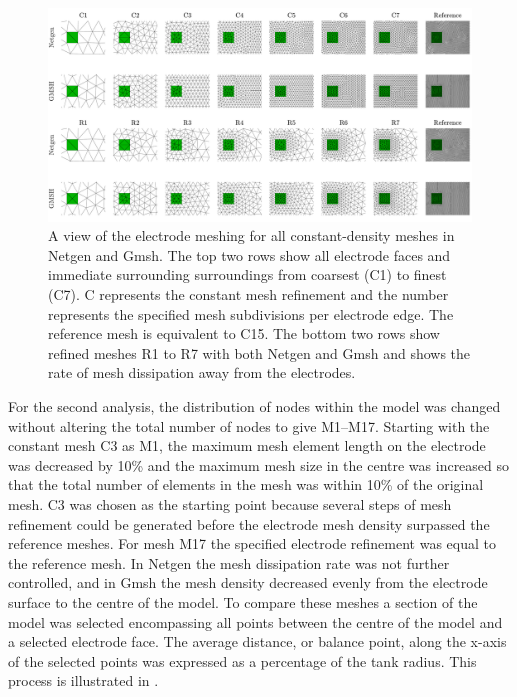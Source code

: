 \begin{figure}[H]
  \includegraphics[width=\textwidth]{chapter4-mesh_refinement/imgs/electrode_mesh_size_large.pdf}
  \caption[Mesh size surrounding the electrode]{\label{fig:electrode_mesh_size} A view of the electrode meshing for all constant-density meshes 
  in Netgen and Gmsh. The top two rows show all electrode faces and immediate surrounding
  surroundings from coarsest (C1) to finest (C7). C represents the constant mesh refinement and the number
  represents the specified mesh subdivisions per electrode edge. The reference mesh is equivalent to C15.
  The bottom two rows show refined meshes R1 to R7 with both Netgen and Gmsh and shows the rate of mesh
  dissipation away from the electrodes.}
\end{figure}

For the second analysis, the distribution of nodes within the 
model was changed without altering 
the total number of nodes to give M1--M17. 
Starting with the constant mesh C3 as M1, the maximum mesh element 
length on the electrode was decreased by 10\% and the maximum mesh size in the centre was
increased so that the total number of elements in the mesh was  within 10\% of the 
original mesh. C3 was chosen as the starting point because several steps of mesh 
refinement could be generated before the electrode mesh density surpassed the reference meshes. 
For mesh M17 the specified electrode refinement was equal to the reference mesh. 
In Netgen the mesh dissipation rate was not further controlled, and in Gmsh the mesh density 
decreased evenly from the electrode surface to the centre of the model. 
To compare these meshes a section of the model was selected
encompassing all points between the centre of the model and a selected electrode face.
The average 
distance, or balance point, along the x-axis of the selected points was expressed 
as a percentage of the tank radius.
This process is illustrated in .
 
